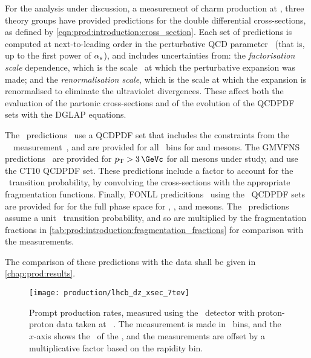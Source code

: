 For the analysis under discussion, a measurement of charm production at 
, three theory groups have provided predictions for the double 
differential cross-sections, as defined by 
\cref{eqn:prod:introduction:cross_section}.
Each set of predictions is computed at next-to-leading order in the 
perturbative \ac{QCD} parameter \alphas\ (that is, up to the first power of 
$\alpha_{s}$), and includes uncertainties from: the \emph{factorisation scale} 
dependence, which is the scale \pdfqsquared\ at which the perturbative 
expansion was made; and the \emph{renormalisation scale}, which is the scale at 
which the expansion is renormalised to eliminate the ultraviolet divergences.
These affect both the evaluation of the partonic cross-sections and of the 
evolution of the \ac{QCDPDF} sets with the \ac{DGLAP} equations.

The \nnpdfl\ predictions~\cite{Gauld:2015yia} use a \ac{QCDPDF} set that 
includes the constraints from the \ \lhcb\ 
measurement~\cite{LHCb-PAPER-2012-041}, and are provided for all \pTy\ bins for 
\PDz and \PDp mesons.
The \ac{GMVFNS} predictions~\cite{Kniehl:2012ti} are provided for $\pT > 
\SI{3}{\GeVc}$ for all mesons under study, and use the CT10 \ac{QCDPDF} set.
These predictions include a factor to account for the \cToHc\ transition 
probability, by convolving the \decay{\ccbar}{\PHc} cross-sections with the 
appropriate fragmentation functions.
Finally, \ac{FONLL} predicitions~\cite{Cacciari:2015fta} using the \nnpdf\ 
\ac{QCDPDF} sets are provided for for the full \pTy phase space for \PDz, \PDp, 
and \PDstarp mesons.
The \fonll\ predictions assume a unit \cToHc\ transition probability, and so 
are multiplied by the fragmentation fractions in 
\cref{tab:prod:introduction:fragmentation_fractions} for comparison with the 
measurements.

The comparison of these predictions with the data shall be given in 
\cref{chap:prod:results}.

\begin{figure}
  \centering
  \texttt{[image: production/lhcb\_dz\_xsec\_7tev]}
  \caption{%
    Prompt \PDzero production rates, measured using the \lhcb\ detector with 
    proton-proton data taken at ~\cite{LHCb-PAPER-2012-041}.
    The measurement is made in \pTy\ bins, and the $x$-axis shows the \pT\ of 
    the \PDzero, and the measurements are offset by a multiplicative factor 
    based on the rapidity bin.
  }
  \label{fig:prod:theory:comparisons:7tev}
\end{figure}

